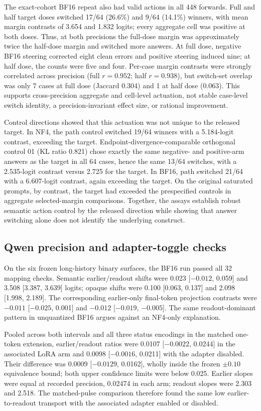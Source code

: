 \documentclass[10pt,twocolumn]{article}
\begin{document}
The exact-cohort BF16 repeat also had valid actions in all 448 forwards. Full and half target doses switched 17/64 (26.6\%) and 9/64 (14.1\%) winners, with mean margin contrasts of 3.654 and 1.832 logits; every aggregate cell was positive at both doses. Thus, at both precisions the full-dose margin was approximately twice the half-dose margin and switched more answers. At full dose, negative BF16 steering corrected eight clean errors and positive steering induced nine; at half dose, the counts were five and four. Per-case margin contrasts were strongly correlated across precision (full $r=0.952$; half $r=0.938$), but switch-set overlap was only 7 cases at full dose (Jaccard 0.304) and 1 at half dose (0.063). This supports cross-precision aggregate and cell-level actuation, not stable case-level switch identity, a precision-invariant effect size, or rational improvement.

Control directions showed that this actuation was not unique to the released target. In NF4, the path control switched 19/64 winners with a 5.184-logit contrast, exceeding the target. Endpoint-divergence-comparable orthogonal control 01 (KL ratio 0.821) chose exactly the same negative- and positive-arm answers as the target in all 64 cases, hence the same 13/64 switches, with a 2.535-logit contrast versus 2.725 for the target. In BF16, path switched 21/64 with a 6.607-logit contrast, again exceeding the target. On the original saturated prompts, by contrast, the target had exceeded the prespecified controls in aggregate selected-margin comparisons. Together, the assays establish robust semantic action control by the released direction while showing that answer switching alone does not identify the underlying construct.

\subsection{Qwen precision and adapter-toggle checks}

On the six frozen long-history binary surfaces, the BF16 run passed all 32 mapping checks. Semantic earlier/readout shifts were 0.023 [$-0.012$, 0.059] and 3.508 [3.387, 3.639] logits; opaque shifts were 0.100 [0.063, 0.137] and 2.098 [1.998, 2.189]. The corresponding earlier-only final-token projection contrasts were $-0.011$ [$-0.025$, 0.001] and $-0.012$ [$-0.019$, $-0.005$]. The same readout-dominant pattern in unquantized BF16 argues against an NF4-only explanation.

Pooled across both intervals and all three status encodings in the matched one-token extension, earlier/readout ratios were 0.0107 [$-0.0022$, 0.0244] in the associated LoRA arm and 0.0098 [$-0.0016$, 0.0211] with the adapter disabled. Their difference was 0.0009 [$-0.0129$, 0.0162], wholly inside the frozen $\pm0.10$ equivalence bound; both upper confidence limits were below 0.025. Earlier slopes were equal at recorded precision, 0.02474 in each arm; readout slopes were 2.303 and 2.518. The matched-pulse comparison therefore found the same low earlier-to-readout transport with the associated adapter enabled or disabled.
\end{document}

